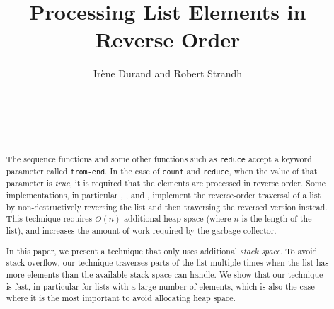 \documentclass{acm_proc_article-sp}
\begin{document}
\title{Processing List Elements in Reverse Order}
\author{\alignauthor
Irène Durand and Robert Strandh\\
\\
\\
\\
\\
}


\maketitle

\begin{abstract}
The \commonlisp{} sequence functions and some other functions such as
\texttt{reduce} accept a keyword parameter called \texttt{from-end}.
In the case of \texttt{count} and \texttt{reduce}, when the value of
that parameter is \emph{true}, it is required that the elements are
processed in reverse order.  Some implementations, in particular
\sbcl{}, \ccl{}, and \lispworks{}, implement the reverse-order
traversal of a list by non-destructively reversing the list and then
traversing the reversed version instead.  This technique requires
$O(n)$ additional heap space (where $n$ is the length of the list),
and increases the amount of work required by the garbage collector.

In this paper, we present a technique that only uses additional
\emph{stack space}.  To avoid stack overflow, our technique traverses
parts of the list multiple times when the list has more elements than
the available stack space can handle.  We show that our technique is
fast, in particular for lists with a large number of elements, which
is also the case where it is the most important to avoid allocating
heap space.
\end{abstract}
\end{document}
